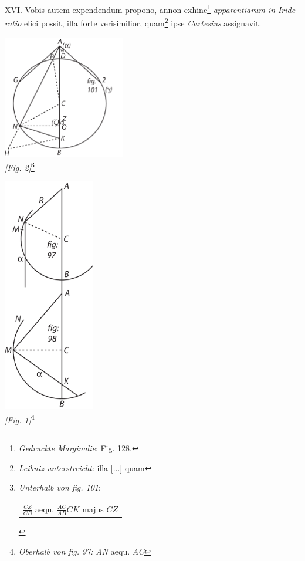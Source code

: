  \pstart [p.~85] XVI. Vobis autem expendendum propono, annon exhinc\footnote{\textit{Gedruckte Marginalie}: Fig. 128.} \textit{apparentiarum in }\textit{Iride}\protect{}\textit{ ratio} elici possit, illa forte verisimilior, quam\footnote{\textit{Leibniz unterstreicht}: illa [...] quam} ipse \textit{Cartesius}\protect{} assignavit.
 \pend
   \begin{center}
   \includegraphics[width=0.4\textwidth]{images/T8_Barrow-2}
   \\ \textit{[Fig. 2]}\footnote{\textit{Unterhalb von fig. 101}:  \renewcommand{\arraystretch}{2.0} \protect\begin{tabular}{c}$\displaystyle\frac{CZ}{CB}$ aequ. $\displaystyle\frac{AC}{AB}$\hspace{5mm}$CK$ majus $CZ$\end{tabular}}\end{center}
\clearpage
   \begin{center} \vspace{2.0ex}
   \includegraphics[width=0.3\textwidth]{images/T8_Barrow-1}
   \\ \textit{[Fig. 1]}\footnote{\textit{Oberhalb von fig. 97:} \textit{AN} aequ. \textit{AC}}
   \end{center}